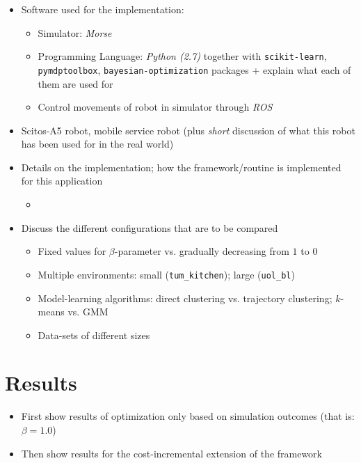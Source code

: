 \begin{itemize}
	\item Software used for the implementation:
	\begin{itemize}
		\item Simulator: \textit{Morse}
		\item Programming Language: \textit{Python (2.7)} together with \texttt{scikit-learn}, \texttt{pymdptoolbox}, \texttt{bayesian-optimization} packages + explain what each of them are used for
		\item Control movements of robot in simulator through \textit{ROS}
	\end{itemize}
	\item Scitos-A5 robot, mobile service robot (plus \textit{short} discussion of what this robot has been used for in the real world)
	\item Details on the implementation; how the framework/routine is implemented for this application
	\begin{itemize}
		\item 
	\end{itemize}
	\item Discuss the different configurations that are to be compared
	\begin{itemize}
		\item Fixed values for $\beta$-parameter vs. gradually decreasing from $1$ to $0$
		\item Multiple environments: small (\texttt{tum\_kitchen}); large (\texttt{uol\_bl})
		\item Model-learning algorithms: direct clustering vs. trajectory clustering; $k$-means vs. GMM
		\item Data-sets of different sizes
	\end{itemize}
\end{itemize}

\section{Results}
\label{sec:results}

\begin{itemize}
	\item First show results of optimization only based on simulation outcomes (that is: $\beta = 1.0$)
	\item Then show results for the cost-incremental extension of the framework
\end{itemize}

